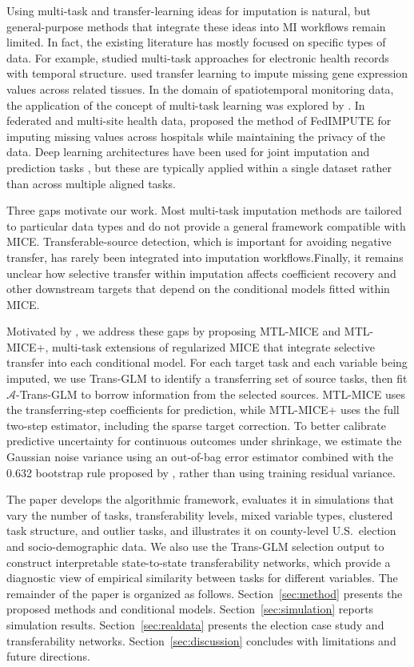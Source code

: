 \documentclass[12pt]{article}
\begin{document}
Using multi-task and transfer-learning ideas for imputation is natural, but general-purpose methods that integrate these ideas into MI workflows remain limited. In fact, the existing literature has mostly focused on specific types of data. For example, \citet{mcdermott_comprehensive_2020} studied multi-task approaches for electronic health records with temporal structure. \citet{zhou_imputing_2020} used transfer learning to impute missing gene expression values across related tissues. In the domain of spatiotemporal monitoring data, the application of the concept of multi-task learning was explored by \citet{zhu_lane_2025}. In federated and multi-site health data, \citet{li_fedimpute_2025} proposed the method of FedIMPUTE for imputing missing values across hospitals while maintaining the privacy of the data. Deep learning architectures have been used for joint imputation and prediction tasks \citep{lai_autoencoder-based_2021}, but these are typically applied within a single dataset rather than across multiple aligned tasks.

Three gaps motivate our work. Most multi-task imputation methods are tailored to particular data types and do not provide a general framework compatible with MICE. Transferable-source detection, which is important for avoiding negative transfer, has rarely been integrated into imputation workflows.Finally, it remains unclear how selective transfer within imputation affects coefficient recovery and other downstream targets that depend on the conditional models fitted within MICE.

Motivated by \citet{tian_transfer_2022} , we address these gaps by proposing MTL-MICE and MTL-MICE+, multi-task extensions of regularized MICE that integrate selective transfer into each conditional model. For each target task and each variable being imputed, we use Trans-GLM to identify a transferring set of source tasks, then fit $\mathcal{A}$-Trans-GLM to borrow information from the selected sources. MTL-MICE uses the transferring-step coefficients for prediction, while MTL-MICE+ uses the full two-step estimator, including the sparse target correction.
To better calibrate predictive uncertainty for continuous outcomes under shrinkage, we estimate the Gaussian noise variance using an out-of-bag error estimator combined with the 0.632 bootstrap rule proposed by \citealt{efron_improvements_1997}, rather than using training residual variance.

The paper develops the algorithmic framework, evaluates it in simulations that vary the number
of tasks, transferability levels, mixed variable types, clustered task structure, and outlier tasks, and illustrates it on county-level U.S.\ election and socio-demographic data. We also use the Trans-GLM selection output to construct interpretable state-to-state transferability networks, which provide a diagnostic view of empirical similarity between tasks for different variables. The remainder of the paper is organized as follows. Section~\ref{sec:method} presents the proposed methods and conditional models.
Section~\ref{sec:simulation} reports simulation results. Section~\ref{sec:realdata} presents the election case study and transferability networks. Section~\ref{sec:discussion} concludes with limitations and future directions.
\end{document}
